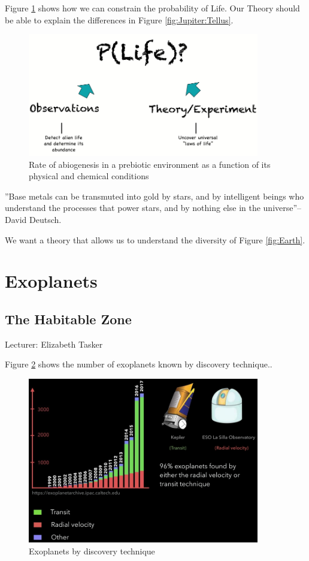 \documentclass[]{article}
\begin{document}
Figure \ref{fig:P:Life} shows how we can constrain the probability of Life.  Our Theory should be able to explain the differences in Figure \ref{fig:Jupiter:Tellus}.

\begin{figure}[H]
	\caption{Rate of abiogenesis in a prebiotic environment as a function of its physical and chemical conditions}\label{fig:P:Life}
	\includegraphics[width=0.9\textwidth]{P_Life}
\end{figure}

''Base metals can be transmuted into gold by stars, and by intelligent beings who understand the processes that power stars, and by nothing else in the universe''--David Deutsch\cite{deutsch2011beginning}.

We want a theory that allows us to understand the diversity of Figure \ref{fig:Earth}.

\section{Exoplanets}

\subsection{The Habitable Zone}

Lecturer: Elizabeth Tasker

Figure \ref{fig:exoplants} shows the number of exoplanets known by discovery technique.\cite{nasa2019Explonet}.

\begin{figure}[H]
	\caption{Exoplanets by discovery technique}\label{fig:exoplants}
	\includegraphics[width=0.9\textwidth]{Exoplanets}
\end{figure}
\end{document}
